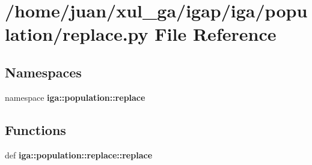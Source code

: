 \section{/home/juan/xul\_\-ga/igap/iga/population/replace.py File Reference}
\label{replace_8py}
\subsection*{Namespaces}
\begin{CompactItemize}
\item 
namespace {\bf iga::population::replace}
\end{CompactItemize}
\subsection*{Functions}
\begin{CompactItemize}
\item 
def {\bf iga::population::replace::replace}
\end{CompactItemize}
